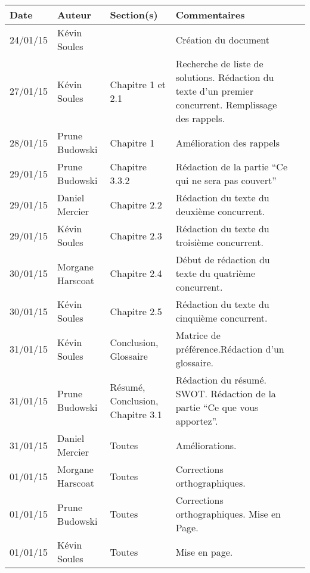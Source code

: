 \small
\begin{tabular}{|p{1.5cm}|l|p{2.5cm}|p{7.8cm}|l|}
  \hline
 
   \rowcolor{Gainsboro}Date  & Auteur & Section(s) & Commentaires \\
  \hline
24/01/15 & Kévin Soules &  & Création du document\\
  \hline
27/01/15 & Kévin Soules & Chapitre 1 et 2.1 & Recherche de liste de solutions. Rédaction du texte d'un premier concurrent. Remplissage des rappels.\\
\hline
28/01/15 & Prune Budowski & Chapitre 1 & Amélioration des rappels \\
\hline
29/01/15 & Prune Budowski & Chapitre 3.3.2 & Rédaction de la partie ``Ce qui ne sera pas couvert''\\
\hline
29/01/15 & Daniel Mercier & Chapitre 2.2 & Rédaction du texte du deuxième concurrent.\\
\hline
29/01/15 & Kévin Soules & Chapitre 2.3 & Rédaction du texte du troisième concurrent. \\
\hline
30/01/15 & Morgane Harscoat & Chapitre 2.4 & Début de rédaction du texte du quatrième concurrent. \\
\hline
30/01/15 & Kévin Soules & Chapitre 2.5 & Rédaction du texte du cinquième concurrent.\\
\hline
31/01/15 & Kévin Soules & Conclusion, Glossaire & Matrice de préférence.Rédaction d'un glossaire. \\
\hline
31/01/15 & Prune Budowski & Résumé, Conclusion, Chapitre 3.1 & Rédaction du résumé. SWOT. Rédaction de la partie ``Ce que vous apportez''.  
  \\
\hline
31/01/15 & Daniel Mercier & Toutes & Améliorations.
\\
\hline
01/01/15 & Morgane Harscoat & Toutes & Corrections orthographiques.
\\
\hline
01/01/15 & Prune Budowski & Toutes & Corrections orthographiques. Mise en Page.
\\
\hline 
01/01/15 & Kévin Soules & Toutes & Mise en page.
\\
  \hline
\end{tabular}
\normalsize
